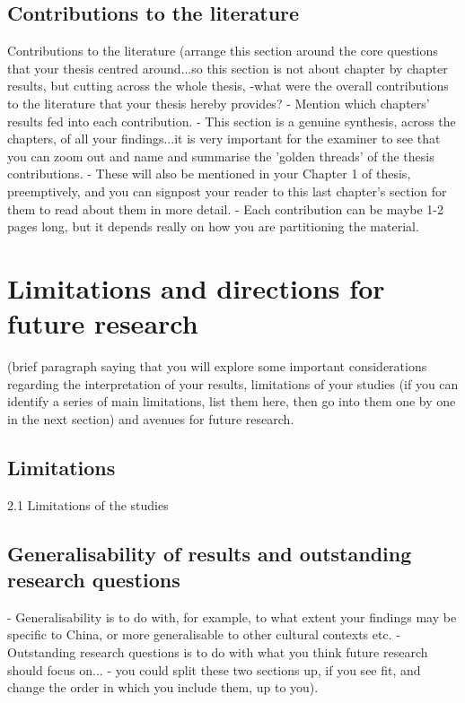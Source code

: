   \subsection{Contributions to the literature}
Contributions to the literature (arrange this section around the core questions that your thesis centred around...so this section is not about chapter by chapter results, but cutting across the whole thesis,
    -what were the overall contributions to the literature that your thesis hereby provides?
    - Mention which chapters' results fed into each contribution.
    - This section is a genuine synthesis, across the chapters, of all your findings...it is very important for the examiner to see that you can zoom out and name and summarise the 'golden threads' of the thesis contributions.
    - These will also be mentioned in your Chapter 1 of thesis, preemptively, and you can signpost your reader to this last chapter's section for them to read about them in more detail.
    - Each contribution can be maybe 1-2 pages long, but it depends really on how you are partitioning the material.

\section{Limitations and directions for future research}


(brief paragraph saying that you will explore some important considerations regarding the interpretation of your results, limitations of your studies (if you can identify a series of main limitations, list them here, then go into them one by one in the next section) and avenues for future research.

\subsection{Limitations}
2.1 Limitations of the studies

\subsection{Generalisability of results and outstanding research questions}
 - Generalisability is to do with, for example, to what extent your findings may be specific to China, or more generalisable to other cultural contexts etc.
 - Outstanding research questions is to do with what you think future research should focus on...
 - you could split these two sections up, if you see fit, and change the order in which you include them, up to you).

